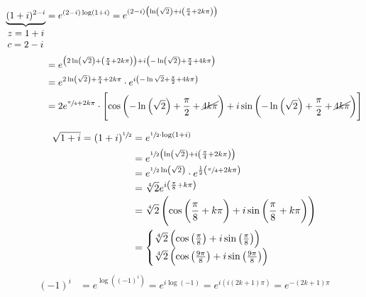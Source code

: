 \documentclass[12pt,a4paper,titlepage,fleqn]{article}
\begin{document}
    \begin{align*}
    \underbrace{(1+i)^{2-i}}_{\mathclap{\begin{array}{l}
    		z=1+i\\ c=2-i
    		\end{array}}} &= e^{(2-i)\log(1+i)}
    = e^{(2-i)\left( \ln\left(\sqrt{2}\right)+i\left(
    	\frac{\pi}{4}+2k\pi
    	\right) \right)}
    \\ &= e^{
       	\left(
       	2\ln\left(\sqrt{2}\right)+\left(\frac{\pi}{4}+2k\pi\right)
       	\right)+i\left(
       	-\ln\left(\sqrt{2}\right)+\frac{\pi}{4}+4k\pi
       	\right)
    }
    \\ &= e^{2\ln\left(\sqrt{2}\right)+\frac{\pi}{4}+2k\pi} \cdot
    e^{i\left(
       	-\ln\sqrt{2}+\frac{\pi}{2}+4k\pi
       	\right)}
    \\ &= 2e^{\sfrac{\pi}{4}+2k\pi}\cdot\left[
    \cos\left(
    -\ln\left(\sqrt{2}\right)+\frac{\pi}{2}+\cancel{4k\pi}
    \right)+i\sin\left(
    -\ln\left(\sqrt{2}\right)+\frac{\pi}{2}+\cancel{4k\pi}
    \right)
    \right]
    \end{align*}
    
    \begin{align*}
    \sqrt{1+i} = (1+i)^{\sfrac{1}{2}} &= e^{\sfrac{1}{2}\cdot\log(1+i)} \\
    &= e^{\sfrac{1}{2}\left( \ln\left(\sqrt{2}\right)
    	+i\left( \frac{\pi}{4}+2k\pi \right)
    	 \right)}
    \\ &= e^{\sfrac{1}{2}\ln\left(\sqrt{2}\right)}\cdot e^{
    	\frac{1}{2}\left( \sfrac{\pi}{4}+2k\pi \right)
    	}
    \\ &= \sqrt[4]{2}e^{i\left( \frac{\pi}{8}+k\pi \right)}
    \\ &= \sqrt[4]{2}\left( \cos\left( \frac{\pi}{8}+k\pi \right)
    +i\sin\left( \frac{\pi}{8}+k\pi \right)\right)
    \\ &= \begin{cases}
    \sqrt[4]{2} \left( \cos\left( \frac{\pi}{8} \right)
    +i\sin\left( \frac{\pi}{8} \right)\right) \\
    \sqrt[4]{2} \left( \cos\left( \frac{9\pi}{8} \right)
    +i\sin\left( \frac{9\pi}{8} \right)\right)
    \end{cases}
    \end{align*}
    \begin{align*}
    (-1)^i &= e^{\log\left( (-1)^i \right)}
    =e^{i\log(-1)} = e^{
    	i\left( i(2k+1)\pi \right)
    	} = e^{-(2k+1)\pi}
    \end{align*}
    
\end{document}
